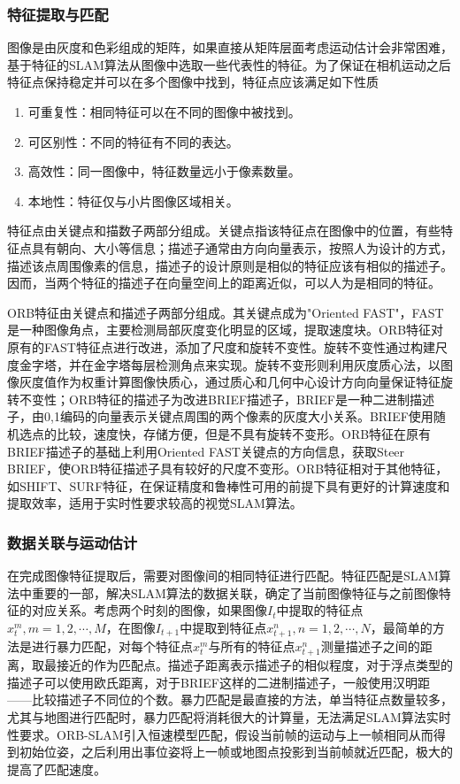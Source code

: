 \subsubsection*{特征提取与匹配}
图像是由灰度和色彩组成的矩阵，如果直接从矩阵层面考虑运动估计会非常困难，基于特征的SLAM算法从图像中选取一些代表性的特征。为了保证在相机运动之后特征点保持稳定并可以在多个图像中找到，特征点应该满足如下性质
\begin{enumerate}[label={(\arabic*)}]
\item 可重复性：相同特征可以在不同的图像中被找到。
\item 可区别性：不同的特征有不同的表达。
\item 高效性：同一图像中，特征数量远小于像素数量。
\item 本地性：特征仅与小片图像区域相关。
\end{enumerate}

特征点由关键点和描数子两部分组成。关键点指该特征点在图像中的位置，有些特征点具有朝向、大小等信息；描述子通常由方向向量表示，按照人为设计的方式，描述该点周围像素的信息，描述子的设计原则是相似的特征应该有相似的描述子。因而，当两个特征的描述子在向量空间上的距离近似，可以人为是相同的特征。

ORB特征由关键点和描述子两部分组成。其关键点成为"Oriented FAST"，FAST是一种图像角点，主要检测局部灰度变化明显的区域，提取速度块。ORB特征对原有的FAST特征点进行改进，添加了尺度和旋转不变性。旋转不变性通过构建尺度金字塔，并在金字塔每层检测角点来实现。旋转不变形则利用灰度质心法，以图像灰度值作为权重计算图像快质心，通过质心和几何中心设计方向向量保证特征旋转不变性；ORB特征的描述子为改进BRIEF描述子，BRIEF是一种二进制描述子，由0,1编码的向量表示关键点周围的两个像素的灰度大小关系。BRIEF使用随机选点的比较，速度快，存储方便，但是不具有旋转不变形。ORB特征在原有BRIEF描述子的基础上利用Oriented FAST关键点的方向信息，获取Steer BRIEF，使ORB特征描述子具有较好的尺度不变形。ORB特征相对于其他特征，如SHIFT、SURF特征，在保证精度和鲁棒性可用的前提下具有更好的计算速度和提取效率，适用于实时性要求较高的视觉SLAM算法。

\subsubsection*{数据关联与运动估计}
在完成图像特征提取后，需要对图像间的相同特征进行匹配。特征匹配是SLAM算法中重要的一部，解决SLAM算法的数据关联，确定了当前图像特征与之前图像特征的对应关系。考虑两个时刻的图像，如果图像$I_t$中提取的特征点$x_t^m,m=1,2,\cdots,M$，在图像$I_{t+1}$中提取到特征点$x_{t+1}^n,n=1,2,\cdots,N$，最简单的方法是进行暴力匹配，对每个特征点$x_t^m$与所有的特征点$x_{t+1}^n$测量描述子之间的距离，取最接近的作为匹配点。描述子距离表示描述子的相似程度，对于浮点类型的描述子可以使用欧氏距离，对于BRIEF这样的二进制描述子，一般使用汉明距——比较描述子不同位的个数。暴力匹配是最直接的方法，单当特征点数量较多，尤其与地图进行匹配时，暴力匹配将消耗很大的计算量，无法满足SLAM算法实时性要求。ORB-SLAM引入恒速模型匹配，假设当前帧的运动与上一帧相同从而得到初始位姿，之后利用出事位姿将上一帧或地图点投影到当前帧就近匹配，极大的提高了匹配速度。

